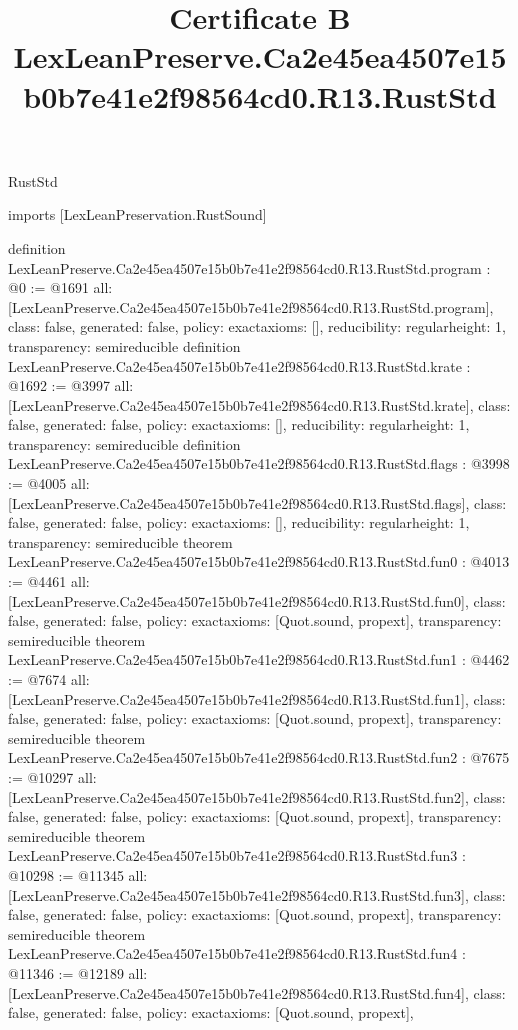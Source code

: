\begin{lexlean}{RustStd}
\title{Certificate B LexLeanPreserve.Ca2e45ea4507e15b0b7e41e2f98564cd0.R13.RustStd}
\begin{coremodule}
imports [LexLeanPreservation.RustSound]

definition LexLeanPreserve.Ca2e45ea4507e15b0b7e41e2f98564cd0.R13.RustStd.program : @0 := @1691 {
  all: [LexLeanPreserve.Ca2e45ea4507e15b0b7e41e2f98564cd0.R13.RustStd.program],
  class: false,
  generated: false,
  policy: exact{axioms: []},
  reducibility: regular{height: 1},
  transparency: semireducible
}
definition LexLeanPreserve.Ca2e45ea4507e15b0b7e41e2f98564cd0.R13.RustStd.krate : @1692 := @3997 {
  all: [LexLeanPreserve.Ca2e45ea4507e15b0b7e41e2f98564cd0.R13.RustStd.krate],
  class: false,
  generated: false,
  policy: exact{axioms: []},
  reducibility: regular{height: 1},
  transparency: semireducible
}
definition LexLeanPreserve.Ca2e45ea4507e15b0b7e41e2f98564cd0.R13.RustStd.flags : @3998 := @4005 {
  all: [LexLeanPreserve.Ca2e45ea4507e15b0b7e41e2f98564cd0.R13.RustStd.flags],
  class: false,
  generated: false,
  policy: exact{axioms: []},
  reducibility: regular{height: 1},
  transparency: semireducible
}
theorem LexLeanPreserve.Ca2e45ea4507e15b0b7e41e2f98564cd0.R13.RustStd.fun0 : @4013 := @4461 {
  all: [LexLeanPreserve.Ca2e45ea4507e15b0b7e41e2f98564cd0.R13.RustStd.fun0],
  class: false,
  generated: false,
  policy: exact{axioms: [Quot.sound, propext]},
  transparency: semireducible
}
theorem LexLeanPreserve.Ca2e45ea4507e15b0b7e41e2f98564cd0.R13.RustStd.fun1 : @4462 := @7674 {
  all: [LexLeanPreserve.Ca2e45ea4507e15b0b7e41e2f98564cd0.R13.RustStd.fun1],
  class: false,
  generated: false,
  policy: exact{axioms: [Quot.sound, propext]},
  transparency: semireducible
}
theorem LexLeanPreserve.Ca2e45ea4507e15b0b7e41e2f98564cd0.R13.RustStd.fun2 : @7675 := @10297 {
  all: [LexLeanPreserve.Ca2e45ea4507e15b0b7e41e2f98564cd0.R13.RustStd.fun2],
  class: false,
  generated: false,
  policy: exact{axioms: [Quot.sound, propext]},
  transparency: semireducible
}
theorem LexLeanPreserve.Ca2e45ea4507e15b0b7e41e2f98564cd0.R13.RustStd.fun3 : @10298 := @11345 {
  all: [LexLeanPreserve.Ca2e45ea4507e15b0b7e41e2f98564cd0.R13.RustStd.fun3],
  class: false,
  generated: false,
  policy: exact{axioms: [Quot.sound, propext]},
  transparency: semireducible
}
theorem LexLeanPreserve.Ca2e45ea4507e15b0b7e41e2f98564cd0.R13.RustStd.fun4 : @11346 := @12189 {
  all: [LexLeanPreserve.Ca2e45ea4507e15b0b7e41e2f98564cd0.R13.RustStd.fun4],
  class: false,
  generated: false,
  policy: exact{axioms: [Quot.sound, propext]},
}
\end{coremodule}
\end{lexlean}
